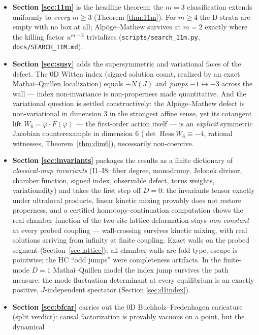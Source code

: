\documentclass[11pt]{article}
\theoremstyle{definition}
\theoremstyle{remark}
\begin{document}
\begin{itemize}
 non-squarefree data) is a Gr\"obner-box gap (Section \ref{sec:gap}).
\item \textbf{Section \ref{sec:11m}} is the headline theorem: the
 $m=3$ classification extends uniformly to \emph{every} $m\ge 3$
 (Theorem \ref{thm:11m}). For $m\ge 4$ the D-strata are empty with no
 box at all; Alp\"oge--Mathew survives at $m=2$ exactly where the
 killing factor $u^{m-2}$ trivializes
 (\texttt{scripts/search\_11m.py}, \texttt{docs/SEARCH\_11M.md}).
\item \textbf{Section \ref{sec:susy}} adds the supersymmetric and
 variational faces of the defect. The 0D Witten index (signed solution
 count, realized by an exact Mathai--Quillen localization) equals
 $-N(J)$ and \emph{jumps} $-1\leftrightarrow-3$ across the wall ---
 index non-invariance is non-properness made quantitative. And the
 variational question is settled constructively: the Alp\"oge--Mathew
 defect is non-variational in dimension 3 in the strongest affine
 sense, yet its cotangent lift $W_6=\bar\varphi\cdot F(\varphi)$ ---
 the first-order action itself --- is an \emph{explicit} symmetric
 Jacobian counterexample in dimension 6
 ($\det\operatorname{Hess}W_6\equiv-4$, rational witnesses,
 Theorem~\ref{thm:dim6}), necessarily non-coercive.
\item \textbf{Section \ref{sec:invariants}} packages the results as a
 finite dictionary of \emph{classical-map invariants} (I1--I8:
 fiber degree, monodromy, Jelonek divisor, chamber function, signed
 index, observable defect, torus weights, variationality) and takes
 the first step off $D=0$: the invariants tensor exactly under
 ultralocal products, linear kinetic mixing provably does not restore
 properness, and a certified homotopy-continuation computation shows
 the real chamber function of the two-site lattice deformation stays
 \emph{non-constant} at every probed coupling --- wall-crossing
 survives kinetic mixing, with real solutions arriving from infinity
 at finite coupling. Exact walls on the probed segment
 (Section~\ref{sec:lattice}): all chamber walls are fold-type, escape
 is pointwise; the HC ``odd jumps'' were completeness artifacts. In
 the finite-mode $D=1$ Mathai--Quillen model
 the index jump survives the path measure: the mode fluctuation
 determinant at every equilibrium is an exactly positive,
 $J$-independent spectator (Section \ref{sec:d1index}).
\item \textbf{Section \ref{sec:bfcar}} carries out the 0D
 Buchholz--Fredenhagen caricature (split verdict): causal
 factorization is provably vacuous on a point, but the dynamical

\end{itemize}
\end{document}
